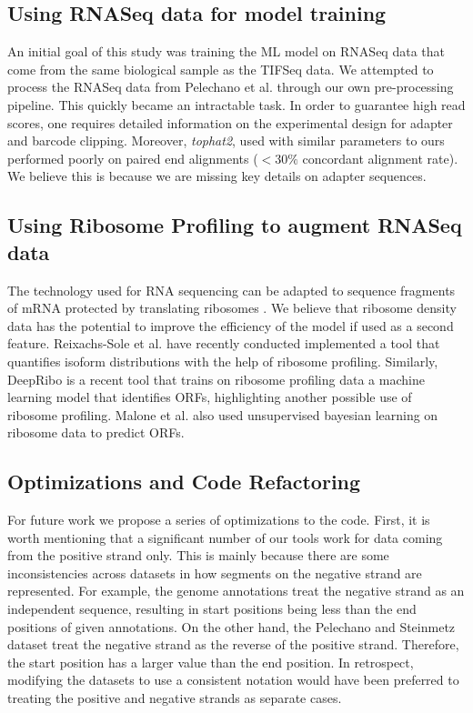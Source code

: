 \documentclass[12pt]{article}
\begin{document}
\subsection{Using RNASeq data for model training} \label{steinmetz_rna}

An initial goal of this study was training the ML model on RNASeq data that come from the same biological sample as the TIFSeq data. We attempted to process the RNASeq data from Pelechano et al. \cite{Pelechano2013} through our own pre-processing pipeline. This quickly became an intractable task. In order to guarantee high read scores, one requires detailed information on the experimental design for adapter and barcode clipping. Moreover, \textit{tophat2}, used with similar parameters to ours performed poorly on paired end alignments ($<30\%$ concordant alignment rate). We believe this is because we are missing key details on adapter sequences. 

\subsection{Using Ribosome Profiling to augment RNASeq data}
The technology used for RNA sequencing can be adapted to sequence fragments of mRNA protected by translating ribosomes \cite{Ingolia2012}. We believe that ribosome density data has the potential to improve the efficiency of the model if used as a second feature. Reixachs-Sole et al. \cite{ReixachsSol2020} have recently conducted implemented a tool that quantifies isoform distributions with the help of ribosome profiling. Similarly, DeepRibo \cite{Clauwaert2019} is a recent tool that trains on ribosome profiling data a machine learning model that identifies ORFs, highlighting another possible use of ribosome profiling. Malone et al. \cite{Malone2017} also used unsupervised bayesian learning on ribosome data to predict ORFs. 
 
\subsection{Optimizations and Code Refactoring}

For future work we propose a series of optimizations to the code. First, it is worth mentioning that a significant number of our tools work for data coming from the positive strand only. This is mainly because there are some inconsistencies across datasets in how segments on the negative strand are represented. For example, the genome annotations treat the negative strand as an independent sequence, resulting in start positions being less than the end positions of given annotations. On the other hand, the Pelechano and Steinmetz \cite{Pelechano2013} dataset treat the negative strand as the reverse of the positive strand. Therefore, the start position has a larger value than the end position. In retrospect, modifying the datasets to use a consistent notation would have been preferred to treating the positive and negative strands as separate cases. 
\end{document}
